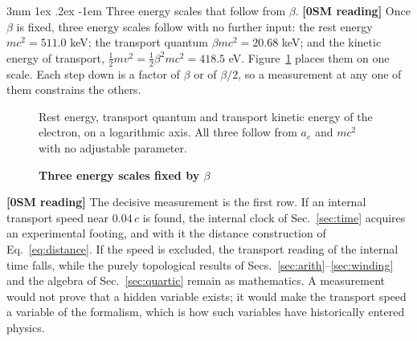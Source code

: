 \documentclass[%
 reprint, amsmath,amssymb, aps, prb, ]{revtex4-2}
\makeatletter
\numberwithin{equation}{section}
\renewcommand\paragraph{%
  \@startsection{paragraph}{4}{\z@}%
    {3mm \@plus 1ex \@minus .2ex}%
    {-1em}%
    {\normalfont\normalsize\itshape}}
\makeatother
\begin{document}
\paragraph{Three energy scales that follow from $\beta$.} \textbf{[0SM reading]} Once $\beta$ is fixed, three energy scales follow with no further input: the rest energy $mc^2=511.0$ keV; the transport quantum $\beta mc^2=20.68$ keV; and the kinetic energy of transport, $\tfrac12mv^2=\tfrac12\beta^2mc^2=418.5$ eV. Figure~\ref{fig:scales} places them on one scale. Each step down is a factor of $\beta$ or of $\beta/2$, so a measurement at any one of them constrains the others.

\begin{figure}[t!]
\centering
{}
\caption{\textbf{Three energy scales fixed by $\beta$}}
\label{fig:scales}
\vspace{0.4em}
\begin{minipage}{0.95\columnwidth}
\justifying\small
Rest energy, transport quantum and transport kinetic energy of the electron, on a logarithmic axis. All three follow from $a_e$ and $mc^2$ with no adjustable parameter.
\end{minipage}
\end{figure}

\textbf{[0SM reading]} The decisive measurement is the first row. If an internal transport speed near $0.04\,c$ is found, the internal clock of Sec.~\ref{sec:time} acquires an experimental footing, and with it the distance construction of Eq.~\eqref{eq:distance}. If the speed is excluded, the transport reading of the internal time falls, while the purely topological results of Secs.~\ref{sec:arith}--\ref{sec:winding} and the algebra of Sec.~\ref{sec:quartic} remain as mathematics. A measurement would not prove that a hidden variable exists; it would make the transport speed a variable of the formalism, which is how such variables have historically entered physics.
\end{document}
